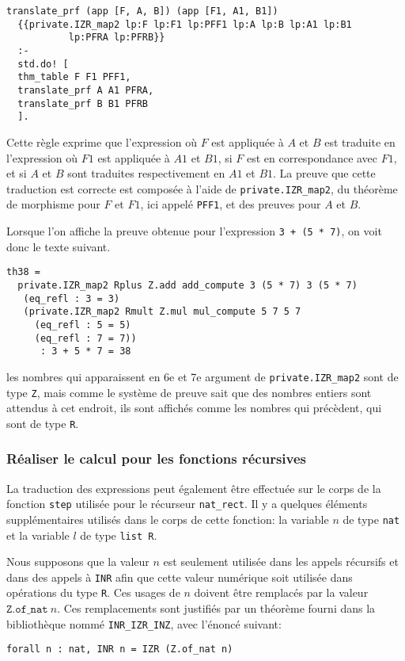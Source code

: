 \documentclass{modjflart}
\begin{document}
\begin{verbatim}
translate_prf (app [F, A, B]) (app [F1, A1, B1])
  {{private.IZR_map2 lp:F lp:F1 lp:PFF1 lp:A lp:B lp:A1 lp:B1
           lp:PFRA lp:PFRB}}
  :-
  std.do! [
  thm_table F F1 PFF1,
  translate_prf A A1 PFRA,
  translate_prf B B1 PFRB
  ].
\end{verbatim}

Cette règle exprime que l'expression où \(F\) est appliquée à \(A\) et
\(B\) est traduite en l'expression où \(F1\) est appliquée à \(A1\) et
\(B1\), si \(F\) est en correspondance avec \(F1\), et si \(A\) et
\(B\) sont traduites respectivement en \(A1\) et \(B1\).  La preuve
que cette traduction est correcte est composée à l'aide de
 \texttt{private.IZR\_map2}, du théorème de morphisme pour \(F\) et \(F1\),
ici appelé \texttt{PFF1}, et des preuves pour \(A\) et \(B\).

Lorsque l'on affiche la preuve obtenue pour l'expression \texttt{3 + (5 *
  7)}, on voit donc le texte suivant.
\begin{verbatim}
th38 =
  private.IZR_map2 Rplus Z.add add_compute 3 (5 * 7) 3 (5 * 7)
   (eq_refl : 3 = 3)
   (private.IZR_map2 Rmult Z.mul mul_compute 5 7 5 7 
     (eq_refl : 5 = 5)
     (eq_refl : 7 = 7))
      : 3 + 5 * 7 = 38
\end{verbatim}
les nombres qui apparaissent en 6e et 7e argument de
\texttt{private.IZR\_map2} sont de type \texttt{Z}, mais comme le système de
preuve sait que des nombres entiers sont attendus à cet endroit, ils
sont affichés comme les nombres qui précèdent, qui sont de type
\texttt{R}.

\subsubsection{Réaliser le calcul pour les fonctions récursives}
La traduction des expressions peut également être effectuée sur le
corps de la fonction \texttt{step} utilisée pour le récurseur
\texttt{nat\_rect}.  Il y a quelques éléments supplémentaires utilisés
dans le corps de cette fonction: la variable \(n\) de type \texttt{nat}
et la variable \(l\) de type \texttt{list R}.  

Nous supposons que la valeur \(n\) est seulement utilisée dans les
appels récursifs et dans des
appels à \texttt{INR} afin que cette valeur numérique soit utilisée dans
opérations du type \texttt{R}.  Ces usages de \(n\) doivent être
remplacés par la valeur \(\texttt{Z.of\_nat}~n\).  Ces remplacements sont
justifiés par un théorème fourni dans la bibliothèque nommé
\texttt{INR\_IZR\_INZ}, avec l'énoncé suivant:
\begin{verbatim}
forall n : nat, INR n = IZR (Z.of_nat n)
\end{verbatim}
\end{document}
